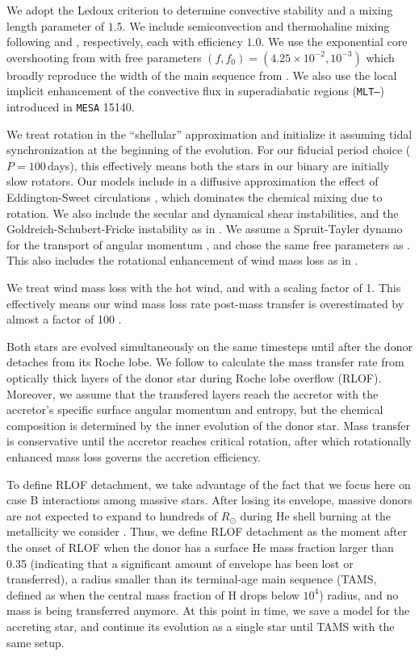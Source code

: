 \documentclass[twocolumn,twocolappendix,trackchanges]{aastex63}
\begin{document}
We adopt the Ledoux criterion to determine convective stability and a
mixing length parameter of $1.5$. We include semiconvection and
thermohaline mixing following \cite{langer:83} and
\cite{kippenhahn:80}, respectively, each with efficiency $1.0$. We use the exponential core overshooting from \cite{herwig:00}
with free parameters $(f, f_0)=(4.25\times10^{-2}, 10^{-3})$
\citep{claret:17} which broadly reproduce the width of the main
sequence from \cite{brott:11}. We also use the local implicit
enhancement of the convective flux in superadiabatic regions
(\texttt{MLT--}) introduced in \texttt{MESA}
15140.

We treat rotation in the ``shellular'' approximation and initialize it
assuming tidal synchronization at the
beginning of the evolution. For our fiducial period choice ($P=100$\,days), this effectively means both the stars in our binary are
initially slow rotators. Our models include in a diffusive
approximation the effect of Eddington-Sweet circulations
\citep{sweet:50}, which dominates the chemical mixing due to
rotation. We also include the secular and dynamical shear
instabilities, and the Goldreich-Schubert-Fricke instability as in
\cite{gotberg:17, gotberg:18, laplace:20, laplace:21}.  We assume a Spruit-Tayler
dynamo for the transport of angular momentum \citep{spruit:02}, and chose the same free
parameters as \cite{heger:00}. This also includes the rotational
enhancement of wind mass loss as in \cite{langer:98}.

We treat wind mass loss with the \cite{vink:00,vink:01} hot wind,
and \cite{dejager:88} with a scaling factor of 1. This effectively
means our wind mass loss rate post-mass transfer is overestimated by
almost a factor of 100 \citep[weak wind problem, see][]{marcolino:09}.


Both stars are evolved simultaneously on the same timesteps until
after the donor detaches from its Roche lobe. We follow \cite{kolb:90}
to calculate the mass transfer rate from optically thick layers of the
donor star during Roche lobe overflow (RLOF). Moreover, we assume that
the transfered layers reach the accretor with the accretor's specific
surface angular momentum and entropy, but the chemical composition is
determined by the inner evolution of the donor star. Mass transfer is
conservative until the accretor reaches critical rotation, after which
rotationally enhanced mass loss governs the accretion efficiency.

To define RLOF detachment, we take advantage of the fact that we focus
here on case B interactions among massive stars. After losing its
envelope, massive donors are not expected to expand to hundreds of
$R_\odot$ during He shell burning at the metallicity we consider
\citep[e.g.,][]{laplace:20}. Thus, we define RLOF detachment as the moment
after the onset of RLOF when the donor has a surface He mass fraction
larger than 0.35 (indicating that a significant amount of envelope has
been lost or transferred), a radius smaller than its terminal-age main
sequence (TAMS, defined as when the central mass fraction of H drops
below $10^4$) radius, and no mass is being transferred anymore. At
this point in time, we save a model for the accreting star, and
continue its evolution as a single star until TAMS with the same
setup.
\end{document}
